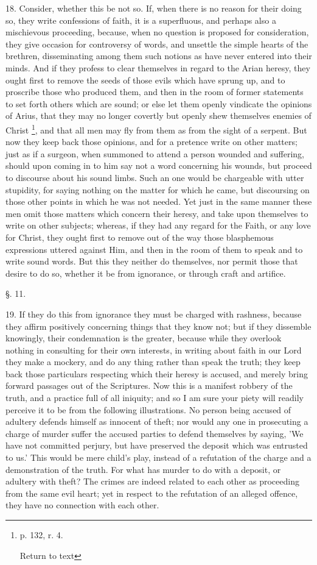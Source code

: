 18. Consider, whether this be not so. If, when
there is no reason for their doing so, they write confessions of
faith, it is a superfluous, and perhaps also a mischievous proceeding,
because, when no question is proposed for consideration, they give
occasion for controversy of words, and unsettle the simple hearts of
the brethren, disseminating among them such notions as have never
entered into their minds. And if they profess to clear themselves in
regard to the Arian heresy, they ought first to remove the seeds of
those evils which have sprung up, and to proscribe those who produced
them, and then in the room of former statements to set forth others
which are sound; or else let them openly vindicate the opinions of
Arius, that they may no longer covertly but openly shew themselves
enemies of Christ \footnote{p. 132, r. 4.

Return to text},
and that all men may fly from them as from the sight of a serpent. But
now they keep back those opinions, and for a pretence write on other
matters; just as if a surgeon, when summoned to attend a person
wounded and suffering, should upon coming in to him say not a word
concerning his wounds, but proceed to discourse about his sound limbs.
Such an one would be chargeable with utter stupidity, for saying
nothing on the matter for which he came, but discoursing on those
other points in which he was not needed. Yet just in the same manner
these men omit those matters which concern their heresy, and take upon
themselves to write on other subjects; whereas, if they had any regard
for the Faith, or any love for Christ, they ought first to remove out
of the way those blasphemous expressions uttered against Him, and then
in the room of them to speak and to write sound words. But this they
neither do themselves, nor permit those that desire to do so, whether
it be from ignorance, or through craft and artifice.

§. 11.

19. If they do this from ignorance they must be
charged with rashness, because they affirm positively concerning
things that they know not; but if they dissemble knowingly, their
condemnation is the greater, because while they overlook nothing in
consulting for their own interests, in writing about faith in
our Lord they make a mockery, and do any thing rather than speak the
truth; they keep back those particulars respecting which their heresy
is accused, and merely bring forward passages out of the Scriptures.
Now this is a manifest robbery of the truth, and a practice full of
all iniquity; and so I am sure your piety will readily perceive it to
be from the following illustrations. No person being accused of
adultery defends himself as innocent of theft; nor would any one in
prosecuting a charge of murder suffer the accused parties to defend
themselves by saying, 'We have not committed perjury, but have
preserved the deposit which was entrusted to us.' This would be mere
child's play, instead of a refutation of the charge and a
demonstration of the truth. For what has murder to do with a deposit,
or adultery with theft? The crimes are indeed related to each other as
proceeding from the same evil heart; yet in respect to the refutation
of an alleged offence, they have no connection with each other.

